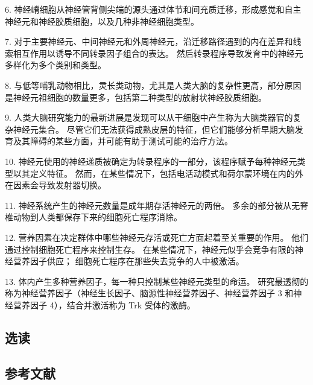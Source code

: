 6. 神经嵴细胞从神经管背侧尖端的源头通过体节和间充质迁移，形成感觉和自主神经元和神经胶质细胞，以及几种非神经细胞类型。 

7. 对于主要神经元、中间神经元和外周神经元，沿迁移路径遇到的内在差异和线索相互作用以诱导不同转录因子组合的表达。 然后转录程序导致发育中的神经元多样化为多个类别和类型。 

8. 与低等哺乳动物相比，灵长类动物，尤其是人类大脑的复杂性更高，部分原因是神经元祖细胞的数量更多，包括第二种类型的放射状神经胶质细胞。 

9. 人类大脑研究能力的最新进展是发现可以从干细胞中产生称为大脑类器官的复杂神经元集合。 尽管它们无法获得成熟皮层的特征，但它们能够分析早期大脑发育及其障碍的某些方面，并可能有助于测试可能的治疗方法。 

10. 神经元使用的神经递质被确定为转录程序的一部分，该程序赋予每种神经元类型以其定义特征。 然而，在某些情况下，包括电活动模式和荷尔蒙环境在内的外在因素会导致发射器切换。 

11. 神经系统产生的神经元数量是成年期存活神经元的两倍。 多余的部分被从无脊椎动物到人类都保存下来的细胞死亡程序消除。

12. 营养因素在决定群体中哪些神经元存活或死亡方面起着至关重要的作用。 他们通过控制细胞死亡程序来控制生存。 在某些情况下，神经元似乎会竞争有限的神经营养因子供应； 细胞死亡程序在那些失去竞争的人中被激活。 

13. 体内产生多种营养因子，每一种只控制某些神经元类型的命运。 研究最透彻的称为神经营养因子（神经生长因子、脑源性神经营养因子、神经营养因子 3 和神经营养因子 4），结合并激活称为 Trk 受体的激酶。

\subsection{选读}
\subsection{参考文献}